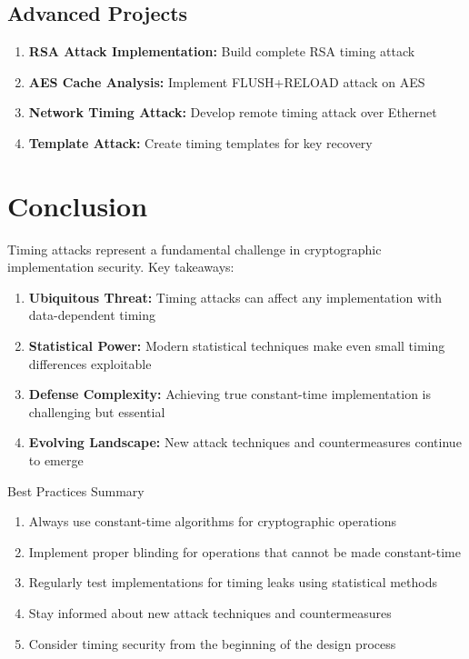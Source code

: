 \documentclass[12pt,a4paper]{article}
\theoremstyle{definition}
\begin{document}
\subsection{Advanced Projects}

\begin{enumerate}
    \item \textbf{RSA Attack Implementation:} Build complete RSA timing attack
    \item \textbf{AES Cache Analysis:} Implement FLUSH+RELOAD attack on AES
    \item \textbf{Network Timing Attack:} Develop remote timing attack over Ethernet
    \item \textbf{Template Attack:} Create timing templates for key recovery
\end{enumerate}

\section{Conclusion}

Timing attacks represent a fundamental challenge in cryptographic implementation security. Key takeaways:

\begin{enumerate}
    \item \textbf{Ubiquitous Threat:} Timing attacks can affect any implementation with data-dependent timing
    \item \textbf{Statistical Power:} Modern statistical techniques make even small timing differences exploitable
    \item \textbf{Defense Complexity:} Achieving true constant-time implementation is challenging but essential
    \item \textbf{Evolving Landscape:} New attack techniques and countermeasures continue to emerge
\end{enumerate}

\begin{definitionbox}{Best Practices Summary}
\begin{enumerate}
    \item Always use constant-time algorithms for cryptographic operations
    \item Implement proper blinding for operations that cannot be made constant-time
    \item Regularly test implementations for timing leaks using statistical methods
    \item Stay informed about new attack techniques and countermeasures
    \item Consider timing security from the beginning of the design process
\end{enumerate}
\end{definitionbox}
\end{document}
